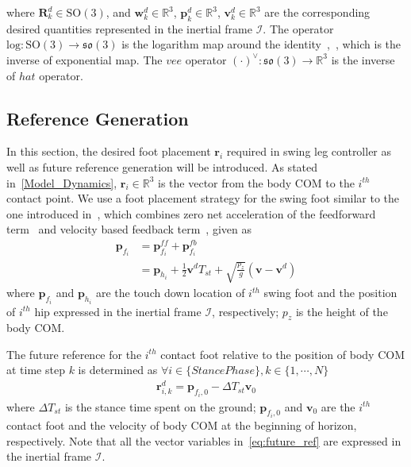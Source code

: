 where $\mathbf{R}^{d}_{k} \in \mathrm{SO}(3)$, and $\mathbf{w}_{k}^{d} \in \mathbb{R}^3$, $\mathbf{p}_{k}^{d} \in \mathbb{R}^3$, $\mathbf{v}_{k}^{d} \in \mathbb{R}^3$ are the corresponding desired quantities represented in the inertial frame $\mathcal{I}$. The operator $\mathrm{log}: \mathrm{SO}(3) \rightarrow \mathfrak{so}(3) $ is the logarithm map around the identity~\cite{lynch2017modern},~\cite{chirikjian2011stochastic}, which is the inverse of exponential map. The $\mathit{vee}$ operator ${(\cdot)}^{\vee} : \mathfrak{so}(3) \rightarrow \mathbb{R}^{3}$ is the inverse of $\mathit{hat}$ operator.

\subsection{Reference Generation} \label{Reference_Generation}
In this section, the desired foot placement $\mathbf{r}_i$ required in swing leg controller as well as future reference generation will be introduced. As stated in~\ref{Model_Dynamics}, $\mathbf{r}_i \in \mathbb{R}^3$ is the vector from the body COM to the $i^{th}$ contact point. We use a foot placement strategy for the swing foot similar to the one introduced in~\cite{gehring2013control,bledt2019implementing}, which combines zero net acceleration of the feedforward term~\cite{raibert1986legged} and velocity based feedback term~\cite{pratt2006velocity}, given as 
\begin{align}
\label{eq:raibert}
\mathbf{p}_{f_i} &= \mathbf{p}_{f_i}^{ff} + \mathbf{p}_{f_i}^{fb} \nonumber \\
&= \mathbf{p}_{h_i} + \frac{1}{2}\mathbf{v}^{d}{T}_{st} + \sqrt{\frac{{p}_{z}}{g}}(\mathbf{v}-\mathbf{v}^{d})
\end{align}
where $\mathbf{p}_{f_i}$ and $\mathbf{p}_{h_i}$ are the touch down location of $i^{th}$ swing foot and the position of $i^{th}$ hip expressed in the inertial frame $\mathcal{I}$, respectively; $p_z$ is the height of the body COM.

The future reference for the $i^{th}$ contact foot relative to the position of body COM at time step $k$ is determined as $\forall{i} \in \{Stance Phase\}, {k}\in\{1,\cdots,N\}$
\begin{align}
\label{eq:future_ref}
\mathbf{r}^{d}_{i,k} = \mathbf{p}_{f_i,0} - \Delta{T}_{st}\mathbf{v}_{0}
\end{align}
where $\Delta{T}_{st}$ is the stance time spent on the ground; $\mathbf{p}_{f_i,0}$ and $\mathbf{v}_{0}$ are the $i^{th}$ contact foot and the velocity of body COM at the beginning of horizon, respectively. Note that all the vector variables in~\eqref{eq:future_ref} are expressed in the inertial frame $\mathcal{I}$.

